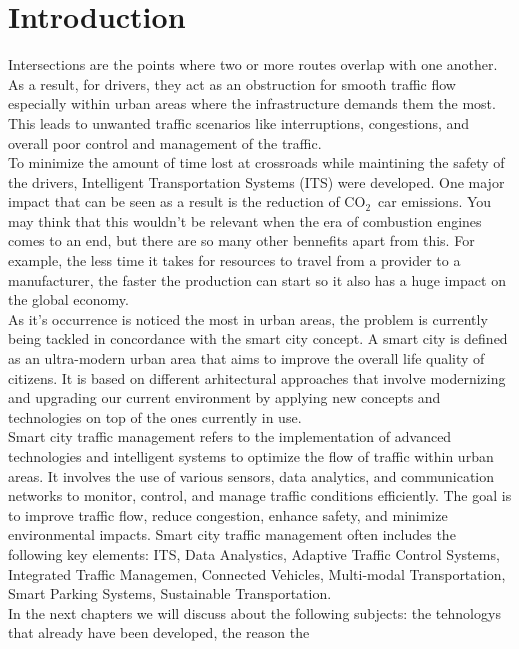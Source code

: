 \documentclass[17pt]{report}
\newcommand{\coo}{\ensuremath{\mathrm{CO_2}}}
\begin{document}
\chapter{Introduction}
\indent \indent
Intersections are the points where two or more
routes overlap with one another. As a result, for drivers, 
they act as an obstruction for smooth traffic
flow especially within urban areas where the
infrastructure demands them the most. This leads to unwanted 
traffic scenarios like interruptions, congestions, and
overall poor control and management of the traffic.\\
\indent \indent
To minimize the amount of time lost at crossroads while
maintining the safety of the drivers, Intelligent
Transportation Systems (ITS) were developed.
One major impact that can be seen as a result is the
reduction of \coo\ car emissions. You may think that
this wouldn't be relevant when the era of combustion
engines comes to an end, but there are so many other
bennefits apart from this. For example, the less time
it takes for resources to travel from a provider to a
manufacturer, the faster the production can start so
it also has a huge impact on the global economy.\\
\indent \indent
As it's occurrence is noticed the most in urban areas,
the problem is currently being tackled in concordance 
with the smart city concept. A smart city is defined as an
ultra-modern urban area that aims to improve the overall life
quality of citizens. It is based on different arhitectural
approaches that involve modernizing and upgrading our current 
environment by applying new concepts and technologies on top
of the ones currently in use.\\
\indent \indent
Smart city traffic management refers to the implementation of advanced
technologies and intelligent systems to optimize the flow of traffic within
urban areas. It involves the use of various sensors, data analytics,
and communication networks to monitor, control, and manage traffic conditions
efficiently. The goal is to improve traffic flow, reduce congestion, enhance safety,
and minimize environmental impacts. Smart city traffic management often includes
the following key elements: ITS, Data Analystics, Adaptive Traffic Control Systems,
Integrated Traffic Managemen, Connected Vehicles, Multi-modal Transportation,
Smart Parking Systems, Sustainable Transportation.\\
\indent \indent
In the next chapters we will discuss about the following subjects: 
the tehnologys that already have been developed, the reason the 
\end{document}
